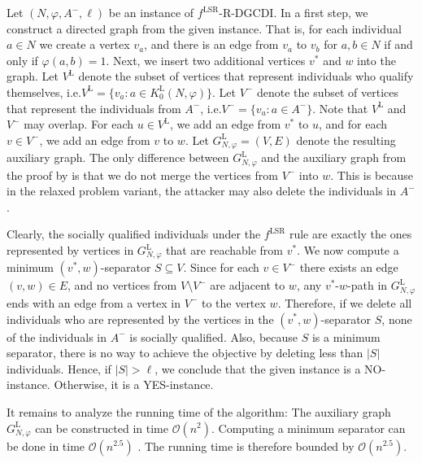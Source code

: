 \documentclass[
    12pt,               %
    a4paper,            %
    bibtotoc,           %
    pointlessnumbers,   %
    ngerman,            %
    titlepage,          %
    leqno,              %
    ]{scrarticle}       %
\begin{document}
\begin{Proof}
Let $(N, \varphi, A^-, \ell)$ be an instance of $f^{\text{LSR}}$-R-DGCDI. In a first step, we construct a directed graph from the given instance. That is, for each individual $a \in N$ we create a vertex $v_a$, and there is an edge from $v_a$ to $v_b$ for $a, b \in N$ if and only if $\varphi(a, b) = 1$. Next, we insert two additional vertices $v^\ast$ and $w$ into the graph. Let $V^{\text{L}}$ denote the subset of vertices that represent individuals who qualify themselves, i.e.\@ $V^{\text{L}} = \{ v_a : a \in K^{\text{L}}_0(N, \varphi) \}$. Let $V^-$ denote the subset of vertices that represent the individuals from $A^-$, i.e.\@ $V^- = \{ v_a : a \in A^- \}$. Note that $V^{\text{L}}$ and $V^-$ may overlap. For each $u \in V^{\text{L}}$, we add an edge from $v^\ast$ to $u$, and for each $v \in V^-$, we add an edge from $v$ to $w$. Let $G_{N, \varphi}^{\text{L}} = (V, E)$ denote the resulting auxiliary graph. The only difference between $G_{N, \varphi}^{\text{L}}$ and the auxiliary graph from the proof by \textcite[Theorem 7]{ERY20} is that we do not merge the vertices from $V^-$ into $w$. This is because in the relaxed problem variant, the attacker may also delete the individuals in $A^-$.

Clearly, the socially qualified individuals under the $f^{\text{LSR}}$ rule are exactly the ones represented by vertices in $G_{N, \varphi}^{\text{L}}$ that are reachable from $v^\ast$. We now compute a minimum $(v^\ast, w)$-separator $S \subseteq V$. Since for each $v \in V^-$ there exists an edge $(v, w) \in E$, and no vertices from $V \setminus V^-$ are adjacent to $w$, any $v^\ast$-$w$-path in $G_{N, \varphi}^{\text{L}}$ ends with an edge from a vertex in $V^-$ to the vertex $w$. Therefore, if we delete all individuals who are represented by the vertices in the $(v^\ast, w)$-separator $S$, none of the individuals in $A^-$ is socially qualified. Also, because $S$ is a minimum separator, there is no way to achieve the objective by deleting less than $|S|$ individuals. Hence, if $|S| > \ell$, we conclude that the given instance is a NO-instance. Otherwise, it is a YES-instance.

It remains to analyze the running time of the algorithm: The auxiliary graph $G_{N, \varphi}^{\text{L}}$ can be constructed in time $\mathcal{O}(n^2)$. Computing a minimum separator can be done in time $\mathcal{O}(n^{2.5})$ \cite{E75,ET75}. The running time is therefore bounded by $\mathcal{O}(n^{2.5})$.
\end{Proof}
\end{document}
